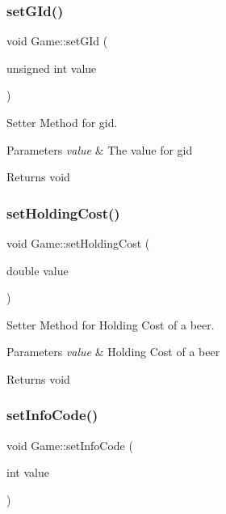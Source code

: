 \subsubsection{\texorpdfstring{set\+G\+Id()}{setGId()}}
{\footnotesize\ttfamily void Game\+::set\+G\+Id (\begin{DoxyParamCaption}\item[{unsigned int}]{value }\end{DoxyParamCaption})}



Setter Method for gid. 


\begin{DoxyParams}{Parameters}
{\em value} & The value for gid \\
\hline
\end{DoxyParams}
\begin{DoxyReturn}{Returns}
void 
\end{DoxyReturn}
\mbox{\label{classGame_a97c662972249ca268ecc387461820c8d}} 
\subsubsection{\texorpdfstring{set\+Holding\+Cost()}{setHoldingCost()}}
{\footnotesize\ttfamily void Game\+::set\+Holding\+Cost (\begin{DoxyParamCaption}\item[{double}]{value }\end{DoxyParamCaption})}



Setter Method for Holding Cost of a beer. 


\begin{DoxyParams}{Parameters}
{\em value} & Holding Cost of a beer \\
\hline
\end{DoxyParams}
\begin{DoxyReturn}{Returns}
void 
\end{DoxyReturn}
\mbox{\label{classGame_a392ed0a6d14eaabb35507a08bd5cb527}} 
\subsubsection{\texorpdfstring{set\+Info\+Code()}{setInfoCode()}}
{\footnotesize\ttfamily void Game\+::set\+Info\+Code (\begin{DoxyParamCaption}\item[{int}]{value }\end{DoxyParamCaption})}



